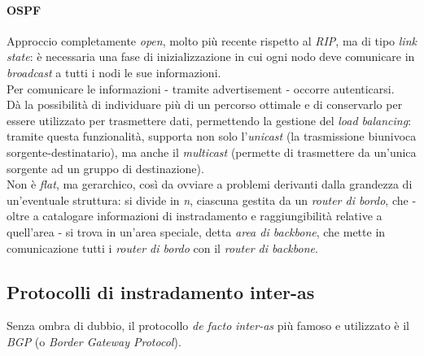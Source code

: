 \paragraph{OSPF}
Approccio completamente \textit{open}, molto più recente rispetto al \textit{RIP}, ma di tipo \textit{link state}: è necessaria una fase di inizializzazione in cui ogni nodo deve comunicare in \textit{broadcast} a tutti i nodi le sue informazioni. \\
Per comunicare le informazioni - tramite advertisement - occorre autenticarsi. \\
Dà la possibilità di individuare più di un percorso ottimale e di conservarlo per essere utilizzato per trasmettere dati, permettendo la gestione del \textit{load balancing}: tramite questa funzionalità, supporta non solo l'\textit{unicast} (la trasmissione biunivoca sorgente-destinatario), ma anche il \textit{multicast} (permette di trasmettere da un'unica sorgente ad un gruppo di destinazione). \\
Non è \textit{flat}, ma gerarchico, così da ovviare a problemi derivanti dalla grandezza di un'eventuale struttura: si divide in \textit{n}, ciascuna gestita da un \textit{router di bordo}, che - oltre a catalogare informazioni di instradamento e raggiungibilità relative a quell'area - si trova in un'area speciale, detta \textit{area di backbone}, che mette in comunicazione tutti i \textit{router di bordo} con il \textit{router di backbone}. 

\subsection{Protocolli di instradamento inter-as}
Senza ombra di dubbio, il protocollo \textit{de facto} \textit{inter-as} più famoso e utilizzato è il \textit{BGP} (o \textit{Border Gateway Protocol}).


